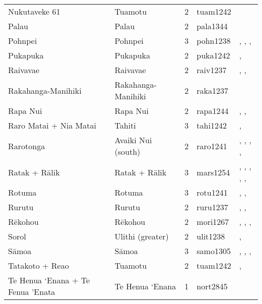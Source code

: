 \begin{longtable}{p{4.5cm}p{2cm}p{2cm}p{2cm}p{4cm}}
  Nukutaveke 61 & Tuamotu & 2 & tuam1242 & \citet{emory1975material} \\ 
  Palau & Palau & 2 & pala1344 & \citet{force1960leadership} \\ 
  Pohnpei & Pohnpei & 3 & pohn1238 & \citet{hanlon2019upon}, \citet{haun1984prehistoric}, \citet{raynor1991indigenous}, \citet{riesenberg1968native} \\ 
  Pukapuka & Pukapuka & 2 & puka1242 & \citet{beagleholeandbeaglehole1938}, \citet{macgregor1935} \\ 
  Raivavae & Raivavae & 2 & raiv1237 & \citet{aitken1930ethnology}, \citet{bollt2008excavations}, \citet{edwards2003archaeological} \\ 
  Rakahanga-Manihiki & Rakahanga-Manihiki & 2 & raka1237 & \citet{buck1932a} \\ 
  Rapa Nui & Rapa Nui & 2 & rapa1244 & \citet{sahlins1958social}, \citet{kirch1984evolution}, \citet{metraux_1971} \\ 
  Raro Matai + Nia Matai & Tahiti & 3 & tahi1242 & \citet{oliver2019ancient}, \citet{oliver2019ancient} \\ 
  Rarotonga & Avaiki Nui (south) & 2 & raro1241 & \citet{bellwood1971varieties}, \citet{buck1934}, \citet{crocombe_1967}, \citet{hayes1981cook}, \citet{walter1996} \\ 
  Ratak + Rālik & Ratak + Rālik & 3 & mars1254 & \citet{carruci1991marshall}, \citet{carruci1991marshall}, \citet{erdland1914}, \citet{erdland1914}, \citet{williamson_1982}, \citet{williamson_1982} \\ 
  Rotuma & Rotuma & 3 & rotu1241 & \citet{gardiner1898natives}, \citet{howard1963conservatism}, \citet{howard1991} \\ 
  Rurutu & Rurutu & 2 & ruru1237 & \citet{aitken1930ethnology}, \citet{bollt2008excavations}, \citet{edwards2003archaeological} \\ 
  Rēkohou & Rēkohou & 2 & mori1267 & \citet{sahlins1958social}, \citet{buck1952}, \citet{kirch1984evolution}, \citet{van1995maori} \\ 
  Sorol & Ulithi (greater) & 2 & ulit1238 & \citet{lessa1950}, \citet{lessa1966} \\ 
  Sāmoa & Sāmoa & 3 & samo1305 & \citet{sahlins1958social}, \citet{buck1930}, \citet{keesing1934}, \citet{watters_1958} \\ 
  Tatakoto + Reao & Tuamotu & 2 & tuam1242 & \citet{emory1975material}, \citet{emory1975material} \\ 
  Te Henua ‘Enana + Te Fenua ’Enata & Te Henua ‘Enana & 1 & nort2845 & \citet{sahlins1958social} \\ 

\end{longtable}

